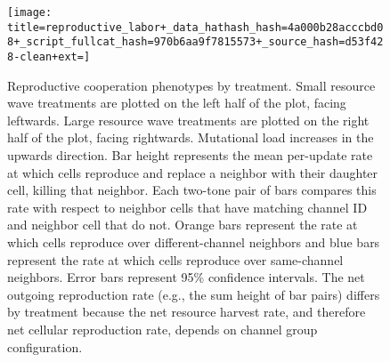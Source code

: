 \begin{figure}[!t]
\begin{center}

\texttt{[image: title=reproductive\_labor+\_data\_hathash\_hash=4a000b28acccbd08+\_script\_fullcat\_hash=970b6aa9f7815573+\_source\_hash=d53f428-clean+ext=]}

\caption{
Reproductive cooperation phenotypes by treatment.
Small resource wave treatments are plotted on the left half of the plot, facing leftwards.
Large resource wave treatments are plotted on the right half of the plot, facing rightwards.
Mutational load increases in the upwards direction.
Bar height represents the mean per-update rate at which cells reproduce and replace a neighbor with their daughter cell, killing that neighbor.
Each two-tone pair of bars compares this rate with respect to neighbor cells that have matching channel ID and neighbor cell that do not.
Orange bars represent the rate at which cells reproduce over different-channel neighbors and blue bars represent the rate at which cells reproduce over same-channel neighbors.
Error bars represent 95\% confidence intervals.
The net outgoing reproduction rate (e.g., the sum height of bar pairs) differs by treatment because the net resource harvest rate, and therefore net cellular reproduction rate, depends on channel group configuration.
} \label{fig:reproductive_labor}
\end{center}
\end{figure}
